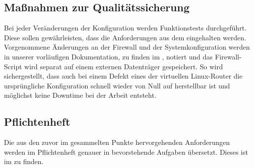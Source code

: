 \subsection{Maßnahmen zur Qualitätssicherung}
\label{sec:Qualitaetssicherung}
Bei jeder Veränderungen der Konfiguration werden Funktionstests durchgeführt. Diese sollen gewährleisten, dass die Anforderungen aus dem  eingehalten werden. Vorgenommene Änderungen an der Firewall und der Systemkonfiguration werden in unserer vorläufigen Dokumentation, zu finden im , notiert und das Firewall-Script wird separat auf einem externen Datenträger gespeichert. So wird sichergestellt, dass auch bei einem Defekt eines der virtuellen Linux-Router die ursprüngliche Konfiguration schnell wieder von Null auf herstellbar ist und möglichst keine Downtime bei der Arbeit entsteht.

\subsection{Pflichtenheft}
\label{sec:Pflichtenheft}
Die aus den zuvor im  gesammelten Punkte hervorgehenden Anforderungen werden im Pflichtenheft genauer in bevorstehende Aufgaben übersetzt. Dieses ist im  zu finden.


